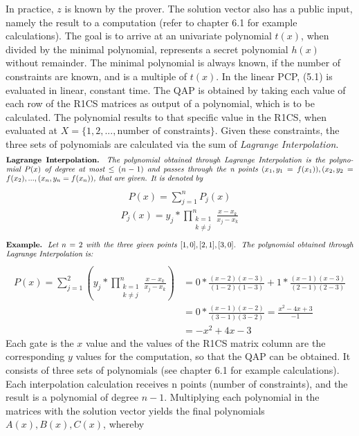In practice, \(z\) is known by the prover. The solution vector also has a public input, namely the result to a computation (refer to chapter 6.1 for example calculations). The goal is to arrive at an univariate polynomial \(t(x)\), when divided by the minimal polynomial, represents a secret polynomial \(h(x)\) without remainder. The minimal polynomial is always known, if the number of constraints are known, and is a multiple of \(t(x)\). In the linear PCP, (5.1) is evaluated in linear, constant time. The QAP is obtained by taking each value of each row of the R1CS matrices as output of a polynomial, which is to be calculated. The polynomial results to that specific value in the R1CS, when evaluated at \(X = \{1, 2, ..., \text{number of constraints}\}\). Given these constraints, the three sets of polynomials are calculated via the sum of \textit{Lagrange Interpolation}.
\begin{align*}
    \text{\parbox{450pt}{\textbf{Lagrange Interpolation.} \textit{The polynomial obtained through Lagrange Interpolation is the polynomial \(P(x)\) of degree at most \(\leq (n-1)\) and passes through the n points \((x_1, y_1 = f(x_1)), (x_2, y_2 = f(x_2), ..., (x_n, y_n = f(x_n))\), that are given. It is denoted by}}}
\end{align*}
\begin{align}
        P(x) = \sum_{j=1}^{n} P_j(x)
\end{align}
\begin{align*}
        P_j(x) = y_j * \prod_{\substack{k = 1 \\ k \neq j}}^{n}\frac{x-x_k}{x_j-x_k}
\end{align*}
\begin{align*}
    \text{\parbox{450pt}{\textbf{Example.} \textit{Let \(n = 2\) with the three given points \([1,0], [2,1], [3,0]\). The polynomial obtained through Lagrange Interpolation is: 
    }}}
\end{align*}
\begin{align*}
    P(x) = \sum_{j=1}^{2}\left(y_j*\prod_{\substack{k = 1 \\ k \neq j}}^{n}\frac{x-x_k}{x_j-x_k}\right)
    &= 0 * \frac{(x-2)(x-3)}{(1-2)(1-3)}+1*\frac{(x-1)(x-3)}{(2-1)(2-3)}\\
    &= 0 * \frac{(x-1)(x-2)}{(3-1)(3-2)} = \frac{x^2-4x+3}{-1}\\
    &= -x^2+4x-3
\end{align*}
Each gate is the \(x\) value and the values of the R1CS matrix column are the corresponding \(y\) values for the computation, so that the QAP can be obtained. It consists of three sets of polynomials (see chapter 6.1 for example calculations). Each interpolation calculation receives n points (number of constraints), and the result is a polynomial of degree \(n-1\). Multiplying each polynomial in the matrices with the solution vector yields the final polynomials \(A(x), B(x), C(x)\), whereby 
